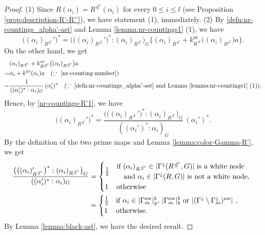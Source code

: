 \documentclass[11pt]{amsart}
\newcommand{\nr}{\mathrm{nr}}
\newcommand{\dc}{\,\underline{\mathrm{d}}^c}
\newcommand{\nw}{\mathrm{nw}}
\begin{document}
{\begin{proof}
(1) Since $R(\alpha_i)=R^{\dc}(\alpha_i)$ for every $0\leq i\leq l$ (see Proposition 
\ref{prop:description-R'-R''}), we have statement (1), immediately. 
\vskip 1mm
\noindent
(2) By \eqref{defn:nr-countings_alpha'-ast} and Lemma
\ref{lemma:nr-countings1} (1), we have
\begin{equation}\label{nr-countings-R'1}
\big((\alpha_i)_{R^{\dc}}'\big)^\ast
=\big(\big((\alpha_i)_{R^{\dc}}'\big)^\ast:(\alpha_i)_{R^{\dc}}\big)_G\big\{
(\alpha_i)_{R^{\dc}}+k_{R^{\dc}}^\nr \big((\alpha_i)_{R^{\dc}}\big)a\big\}.
\end{equation}
On the other hand, we get 
\[\begin{aligned}
&(\alpha_i)_{R^{\dc}}+k_{R^{\dc}}^\nr \big((\alpha_i)_{R^{\dc}}\big)a \\
=
&\alpha_i+k^\nr(\alpha_i)a\quad (\because\ \eqref{nr-counting-number})\\
=
&\dfrac{1}{((\alpha_i')^\ast:\alpha_i)_G}\, (\alpha_i')^\ast
\quad (\because\ \text{\eqref{defn:nr-countings_alpha'-ast} and Lemma
\ref{lemma:nr-countings1} (1)}).
\end{aligned}\]
Hence, by \eqref{nr-countings-R'1}, we have
\[\big((\alpha_i)_{R^{\dc}}'\big)^\ast= 
\dfrac{\big(\big((\alpha_i)_{R^{\dc}}'\big)^\ast:(\alpha_i)_{R^{\dc}}\big)_G}
{((\alpha_i')^\ast:\alpha_i)_G}\, (\alpha_i')^\ast.\]
By the definition of the two prime maps and Lemma 
\ref{lemma:color-Gamma-R'}, we get  
\begin{align*}
\dfrac{\big(\big((\alpha_i)_{R^{\dc}}'\big)^\ast:(\alpha_i)_{R^{\dc}}\big)_G}
{((\alpha_i')^\ast:\alpha_i)_G}
&=\begin{cases}
\frac12 & \!\!\! \begin{array}{ll}
\text{if $(\alpha_i)_{R^{\dc}}\in |\Gamma^\downarrow (R^{\dc},G)|$ is a white node}\\
\text{\quad and $\alpha_i\in |\Gamma^\downarrow (R,G)|$ is not a white node},
\end{array}
\\
1 & \text{otherwise}
\end{cases}\\
&=\begin{cases}
\frac12 & \text{if $\alpha_i\in |\Gamma^\nw_m|_g^b,\, 
|\Gamma^\nw_m|_b^b$ or 
$|(\Gamma^{\downarrow}\setminus \Gamma^{\downarrow}_m)^\nw|$
},\\
1 & \text{otherwise}.
\end{cases}
\end{align*}
By Lemma \ref{lemma:black-ast}, we have the desired result.

\end{proof}}
\end{document}
